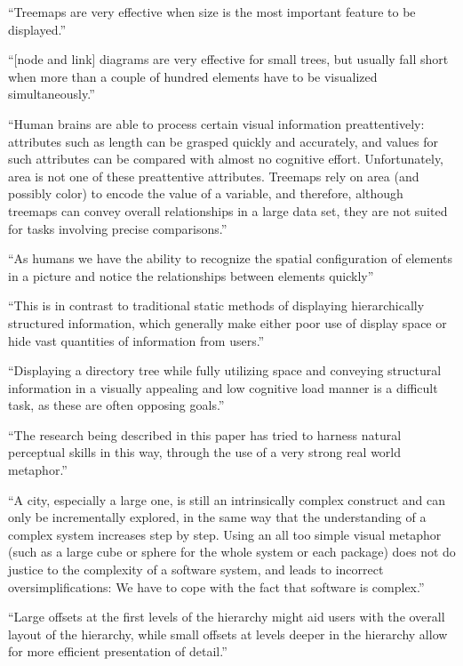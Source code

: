 \enquote{Treemaps are very effective when size is the most important feature to be displayed.}\cite[2]{bruls2000squarified}

\enquote{[node and link] diagrams are very effective for small trees, but usually fall short when more than a couple of hundred elements have to be visualized simultaneously.}\cite[2]{bruls2000squarified}

\enquote{Human brains are able to process certain visual information preattentively: attributes such as length can be grasped quickly and accurately, and values for such attributes can be compared with almost no cognitive effort. Unfortunately, area is not one of these preattentive attributes. Treemaps rely on area (and possibly color) to encode the value of a variable, and therefore, although treemaps can convey overall relationships in a large data set, they are not suited for tasks involving precise comparisons.}\cite{laubheimer_2019}

\enquote{As humans we have the ability to recognize the spatial configuration of elements in a picture and notice the relationships between elements quickly}\cite[2]{johnson1998tree}

\enquote{This is in contrast to traditional static methods of displaying
hierarchically structured information, which generally make either poor use of
display space or hide vast quantities of information from users.}\cite[2]{johnson1998tree}

\enquote{Displaying a directory tree while fully utilizing space and conveying structural information in a visually appealing and low cognitive load manner is a difficult task, as these are often opposing goals.}\cite[8]{johnson1998tree}

\enquote{The research being described in this paper has tried to harness natural perceptual skills in this way, through the use of a very strong real world metaphor.}\cite[2]{virtualButVisibleMunro}

\enquote{A city, especially a large one, is still an intrinsically complex construct and can only be incrementally explored, in the same way that the understanding of a complex system increases step by step. Using an all too simple visual metaphor (such as a large cube or sphere for the whole system or each package) does not do justice to the complexity of a software system, and leads to incorrect oversimplifications: We have to cope with the fact that software is complex.}\cite[2]{codeCity1}

\enquote{Large offsets at the first levels of the hierarchy might aid users with the overall layout of the hierarchy, while small offsets at levels deeper in the hierarchy allow for more efficient presentation of detail.}\cite[52]{johnson1993treemapsPhd}

